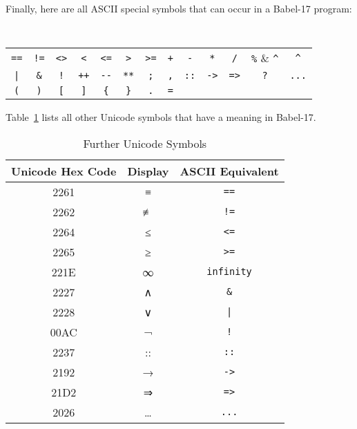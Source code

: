 \documentclass[11pt]{amsart}
\newcommand{\babelsrc}[1] {\lstinline!#1!}
\begin{document}
Finally, here are all ASCII special symbols that can occur in a Babel-17 program:
\newcommand{\mapcurlyleft}{\{|}
\begin{center}
\tt
\begin{tabular}{ccccccccccccc}
\verb+==+ & \verb+!=+ & \verb+<>+ & \verb+<+ & \verb+<=+ & \verb+>+& \verb+>=+  &
\verb-+- & \verb+-+ & \verb+*+ & \verb+/+ & \verb+%+ & \verb+^+  \\
\verb-|- & \verb+&+ & \verb+!+ & \verb-++- & \verb+--+& \verb+**+  &
\verb-;- & \verb+,+ & \verb+::+ & \verb+->+ & \verb+=>+& \verb+?+  & \verb+...+  \\
\verb-(- & \verb+)+ & \verb+[+ & \verb+]+ & \verb+{+& \verb+}+  & \verb+.+ &  \verb+=+  &
& & & 
\end{tabular}
\end{center}
Table~\ref{table:furthersymbols} lists all other Unicode symbols that have a meaning in Babel-17.
\begin{table}
\caption{Further Unicode Symbols}
\begin{tabular}{c|c|c}
\textbf{Unicode Hex Code} & \textbf{Display} & \textbf{ASCII Equivalent}\\\hline
2261 & ≡ & \verb+==+\\
2262 & ≢ & \verb+!=+\\
2264 & ≤ & \verb+<=+\\
2265 &  ≥ & \verb+>=+\\
221E & ∞ & \babelsrc{infinity}\\ 
2227 & ∧ & \verb+&+\\
2228 & ∨ & \verb+|+\\
00AC & ¬ & \verb+!+\\
2237 & :: & \verb+::+\\
2192 & → & \verb+->+\\
21D2 & ⇒ & \verb+=>+\\
2026 & … & \verb+...+\\
\end{tabular}
\label{table:furthersymbols}
\end{table}
\end{document}
